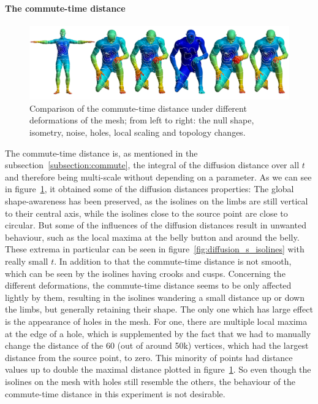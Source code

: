 \paragraph{The commute-time distance}
\begin{figure}[h]
	\centering
	\includegraphics[width = \textwidth]{../results/commute_time_isolines}
	\caption{Comparison of the commute-time distance under different deformations of the mesh; from left to right: the null shape, isometry, noise, holes, local scaling and topology changes.}
	\label{fig:commute_time_isolines}
\end{figure}
The commute-time distance is, as mentioned in the subsection~\ref{subsection:commute}, the integral of the diffusion distance  over all $t$ and therefore being multi-scale without depending on a parameter.
As we can see in figure~\ref{fig:commute_time_isolines}, it obtained some of the diffusion distances properties:
The global shape-awareness has been preserved, as the isolines on the limbs are still vertical to their central axis, while the isolines close to the source point are close to circular.
But some of the influences of the diffusion distances result in unwanted behaviour, such as the local maxima at the belly button and around the belly.
These extrema in particular can be seen in figure~\ref{fig:diffusion_s_isolines} with really small $t$.
In addition to that the commute-time distance is not smooth, which can be seen by the isolines having crooks and cusps.
Concerning the different deformations, the commute-time distance seems to be only affected lightly by them, resulting in the isolines wandering a small distance up or down the limbs, but generally retaining their shape.
The only one which has large effect is the appearance of holes in the mesh.
For one, there are multiple local maxima at the edge of a hole, which is supplemented by the fact that we had to manually change the distance of the 60 (out of around 50k) vertices, which had the largest distance from the source point, to zero.
This minority of points had distance values up to double the maximal distance plotted in figure~\ref{fig:commute_time_isolines}.
So even though the isolines on the mesh with holes still resemble the others, the behaviour of the commute-time distance in this experiment is not desirable.

